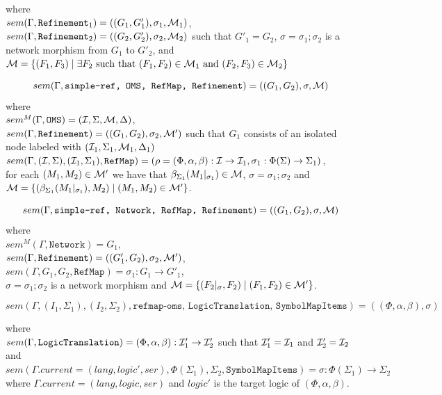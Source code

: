 \documentclass[10pt,fleqn,%
\ifpretendfinal
final%
\else
draft%
\fi,
]{scrreprt}
\newcommand*{\syntax}[1]{\texttt{#1}}
\newcommand{\semdom}[1]{
\begin{center}
\fbox{$#1$}
\end{center}
}
\newcommand{\current}{\mathit{current}}
\begin{document}
\noindent where\\ 
$sem(\Gamma, \syntax{Refinement}_1) = 
((G_1, G'_1), \sigma_1, \cM_1)$,
$sem(\Gamma, \syntax{Refinement}_2) = 
((G_2, G'_2), \sigma_2, \cM_2)$
such that $G'_1 = G_2$,
$\sigma = \sigma_1;\sigma_2$
is a network morphism from $G_1$ to $G'_2$, 
and
${\cal M} = \{(F_1, F_3) \mid \exists F_2 \text{ such that } 
(F_1, F_2) \in {\cal M}_1  \text{ and }
(F_2, F_3) \in {\cal M}_2  \}$

$$sem(\Gamma, \syntax{simple-ref, OMS, RefMap, Refinement}) = 
((G_1, G_2), \sigma, \cM)$$
where\\
 $sem^M(\Gamma,  \syntax{OMS}) = (\cI,\Sigma, \cM, \Delta)$,\\
 $sem(\Gamma,  \syntax{Refinement}) = 
 ((G_1, G_2), \sigma_2, \cM')$ 
 such that $G_1$ consists of an isolated node labeled with 
 $({\cal I}_1, \Sigma_1, {\cal M}_1, \Delta_1)$\\
 $sem(\Gamma,  (\cI,\Sigma), (\cI_1,\Sigma_1), \syntax{RefMap}) = (\rho = (\Phi, \alpha,\beta):\cI\to\cI_1, \sigma_1:\Phi(\Sigma)\to\Sigma_1)$,\\
 for each $(M_1, M_2) \in {\cal M}'$
 we have that 
$\beta_{\Sigma_1}(M_1|_{\sigma_1}) \in {\cal M}$,
$\sigma = \sigma_1;\sigma_2$ and
${\cal M} = \{ (\beta_{\Sigma_1}(M_1|_{\sigma_1}), M_2) \mid
(M_1, M_2) \in {\cal M}' \}$.

$$sem(\Gamma, \syntax{simple-ref, Network, RefMap, Refinement}) = 
((G_1,G_2),\sigma, \cM)$$
where\\
 $sem^M(\Gamma,  \syntax{Network}) = G_1$,\\
 $sem(\Gamma,  \syntax{Refinement}) = ((G'_1, G_2),\sigma_2, \cM')$,\\ 
 $sem(\Gamma, G_1, G_2, \syntax{RefMap}) = \sigma_1:G_1\to G'_1$,\\
 $\sigma = \sigma_1;\sigma_2$ is a network morphism
 and 
 ${\cal M} = \{( F_2|_{\sigma} , F_2) \mid (F_1, F_2) \in {\cal M}' \}$.



\semdom{sem(\Gamma, (I_1,\Sigma_1), (I_2,\Sigma_2), \syntax{RefMap}) = (\rho, \sigma)}

$$sem(\Gamma, (I_1,\Sigma_1), (I_2,\Sigma_2), \syntax{refmap-oms, LogicTranslation, SymbolMapItems}) = ((\Phi,\alpha,\beta), \sigma) $$

where\\
 $sem(\Gamma, \syntax{LogicTranslation}) = (\Phi,\alpha,\beta) : \cI'_1\to\cI'_2$ 
such that ${\cal I}'_1 = {\cal I}_1$ and ${\cal I}'_2 = {\cal I}_2$ \\
and 
$sem(\Gamma.\current=(lang, logic',ser), \Phi(\Sigma_1),\Sigma_2, \syntax{SymbolMapItems}) = \sigma : \Phi(\Sigma_1) \to \Sigma_2$
where $\Gamma.\current=(lang, logic,ser)$ and $logic'$ is the target logic of $(\Phi,\alpha,\beta)$.
\end{document}
